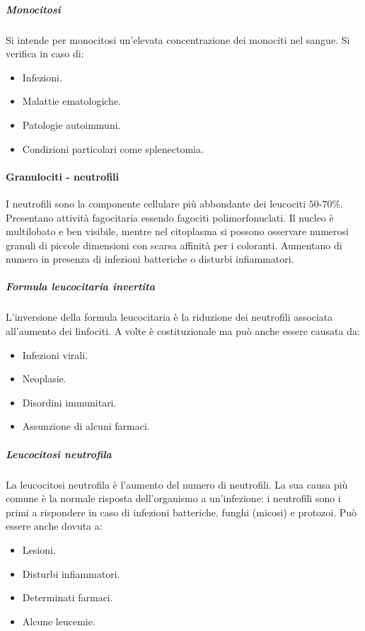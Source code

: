 				\subparagraph{Monocitosi}
				Si intende per monocitosi un'elevata concentrazione dei monociti nel sangue. 
				Si verifica in caso di:
				\begin{itemize}
					\item Infezioni.
					\item Malattie ematologiche.
					\item Patologie autoimmuni.
					\item Condizioni particolari come splenectomia.
				\end{itemize}

			\paragraph{Granulociti - neutrofili}
			I neutrofili sono la componente cellulare pi\`u abbondante dei leucociti $50$-$70\%$. 
			Presentano attivit\`a fagocitaria essendo fagociti polimorfonuclati.
			Il nucleo \`e multilobato e ben visibile, mentre nel citoplasma si possono osservare numerosi granuli di piccole dimensioni con scarsa affinit\`a per i coloranti.
			Aumentano di numero in presenza di infezioni batteriche o disturbi infiammatori. 

				\subparagraph{Formula leucocitaria invertita}
				L'inversione della formula leucocitaria \`e la riduzione dei neutrofili associata all'aumento dei linfociti.
				A volte \`e costituzionale ma pu\`o anche essere causata da:
				\begin{itemize}
					\item Infezioni virali.
					\item Neoplasie.
					\item Disordini immunitari.
					\item Assunzione di alcuni farmaci.
				\end{itemize}

				\subparagraph{Leucocitosi neutrofila}
				La leucocitosi neutrofila \`e l'aumento del numero di neutrofili.
				La sua causa pi\`u comune \`e la normale risposta dell'organismo a un'infezione: i neutrofili sono i primi a rispondere in caso di infezioni batteriche, funghi (micosi) e protozoi.
				Pu\`o essere anche dovuta a:
				\begin{itemize}
					\item Lesioni.
					\item Disturbi infiammatori.
					\item Determinati farmaci.
					\item Alcune leucemie.
				\end{itemize}

